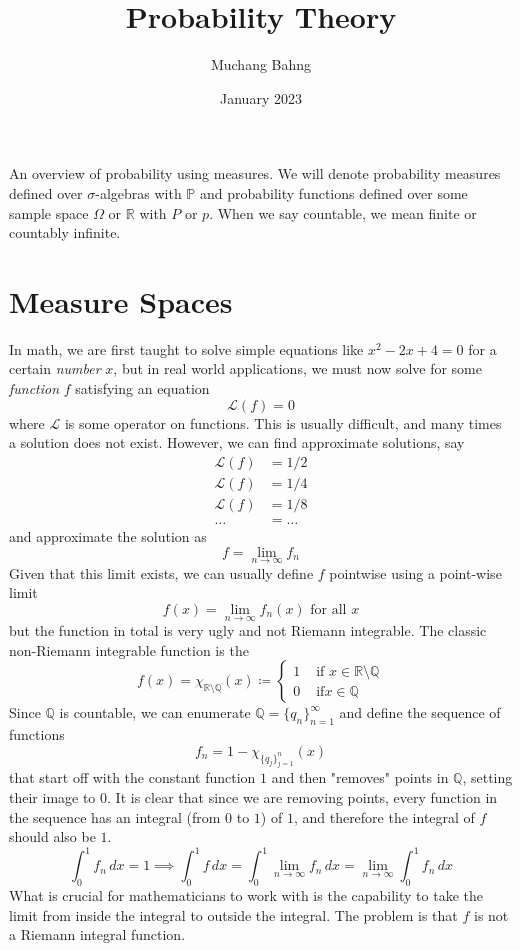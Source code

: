 \documentclass{article}
\theoremstyle{definition}
\theoremstyle{remark}
\theoremstyle{definition}
\begin{document}
\pagestyle{fancy}

\cfoot{\thepage / \pageref{LastPage}}

\title{Probability Theory}
\author{Muchang Bahng}
\date{January 2023}

\maketitle
\tableofcontents
\pagebreak 

An overview of probability using measures. We will denote probability measures defined over $\sigma$-algebras with $\mathbb{P}$ and probability functions defined over some sample space $\Omega$ or $\mathbb{R}$ with $P$ or $p$. When we say countable, we mean finite or countably infinite. 

\section{Measure Spaces}

In math, we are first taught to solve simple equations like $x^2 - 2x + 4 = 0$ for a certain \textit{number} $x$, but in real world applications, we must now solve for some \textit{function} $f$ satisfying an equation 
\[\mathcal{L}(f) = 0\]
where $\mathcal{L}$ is some operator on functions. This is usually difficult, and many times a solution does not exist. However, we can find approximate solutions, say 
\begin{align*}
    \mathcal{L}(f) & = 1/2 \\
    \mathcal{L}(f) & = 1/4 \\ 
    \mathcal{L}(f) & = 1/8 \\
    \ldots & = \ldots 
\end{align*}
and approximate the solution as 
\[f = \lim_{n \rightarrow \infty} f_n \]
Given that this limit exists, we can usually define $f$ pointwise using a point-wise limit 
\[f(x) = \lim_{n \rightarrow \infty} f_n (x) \text{ for all } x\]
but the function in total is very ugly and not Riemann integrable. The classic non-Riemann integrable function is the 
\[f(x) = \chi_{\mathbb{R} \setminus \mathbb{Q}} (x) \coloneqq \begin{cases} 
1 & \text{ if } x \in \mathbb{R} \setminus \mathbb{Q} \\
0 & \text{ if} x \in \mathbb{Q} 
\end{cases}\]
Since $\mathbb{Q}$ is countable, we can enumerate $\mathbb{Q} = \{q_n\}_{n=1}^\infty$ and define the sequence of functions 
\[f_n = 1 - \chi_{\{q_j\}_{j=1}^n}(x)\]
that start off with the constant function $1$ and then "removes" points in $\mathbb{Q}$, setting their image to $0$. It is clear that since we are removing points, every function in the sequence has an integral (from $0$ to $1$) of $1$, and therefore the integral of $f$ should also be $1$. 
\[\int_0^1 f_n \, dx = 1 \implies \int_0^1 f \,dx = \int_0^1 \lim_{n \rightarrow \infty} f_n \,dx = \lim_{n \rightarrow \infty} \int_0^1 f_n \,dx\]
What is crucial for mathematicians to work with is the capability to take the limit from inside the integral to outside the integral. The problem is that $f$ is not a Riemann integral function. 
\end{document}
